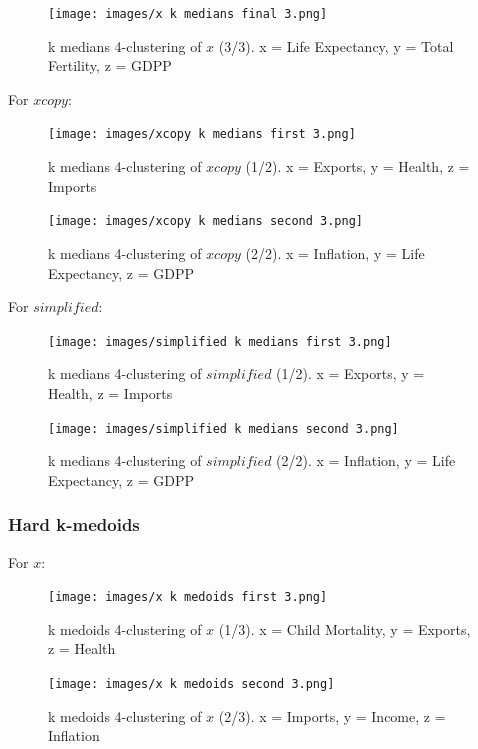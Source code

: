 \documentclass[12pt, a4paper]{article}
\begin{document}
\begin{figure}[H]
    \centering
    \texttt{[image: images/x k medians final 3.png]}
    \caption{k medians 4-clustering of $x$ (3/3). x = Life Expectancy, y = Total Fertility, z = GDPP}
    \label{fig:ncopy-optimal}
\end{figure}

For $xcopy$:

\begin{figure}[H]
    \centering
    \texttt{[image: images/xcopy k medians first 3.png]}
    \caption{k medians 4-clustering of $xcopy$ (1/2). x = Exports, y = Health, z = Imports}
    \label{fig:ncopy-optimal}
\end{figure}

\begin{figure}[H]
    \centering
    \texttt{[image: images/xcopy k medians second 3.png]}
    \caption{k medians 4-clustering of $xcopy$ (2/2). x = Inflation, y = Life Expectancy, z = GDPP}
    \label{fig:ncopy-optimal}
\end{figure}

For $simplified$:

\begin{figure}[H]
    \centering
    \texttt{[image: images/simplified k medians first 3.png]}
    \caption{k medians 4-clustering of $simplified$ (1/2). x = Exports, y = Health, z = Imports}
    \label{fig:ncopy-optimal}
\end{figure}

\begin{figure}[H]
    \centering
    \texttt{[image: images/simplified k medians second 3.png]}
    \caption{k medians 4-clustering of $simplified$ (2/2). x = Inflation, y = Life Expectancy, z = GDPP}
    \label{fig:ncopy-optimal}
\end{figure}

\subsubsection{Hard k-medoids}

For $x$:

\begin{figure}[H]
    \centering
    \texttt{[image: images/x k medoids first 3.png]}
    \caption{k medoids 4-clustering of $x$ (1/3). x = Child Mortality, y = Exports, z = Health}
    \label{fig:ncopy-optimal}
\end{figure}

\begin{figure}[H]
    \centering
    \texttt{[image: images/x k medoids second 3.png]}
    \caption{k medoids 4-clustering of $x$ (2/3). x = Imports, y = Income, z = Inflation}
    \label{fig:ncopy-optimal}
\end{figure}
\end{document}
